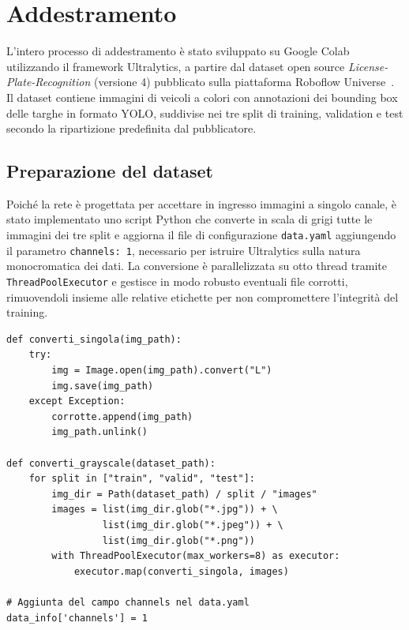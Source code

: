 \section{Addestramento}
\label{sec:addestramento}

L'intero processo di addestramento è stato sviluppato su Google Colab utilizzando il framework Ultralytics, a partire dal dataset open source \textit{License-Plate-Recognition} (versione 4) pubblicato sulla piattaforma Roboflow Universe~\cite{roboflow_universe}. Il dataset contiene immagini di veicoli a colori con annotazioni dei bounding box delle targhe in formato YOLO, suddivise nei tre split di training, validation e test secondo la ripartizione predefinita dal pubblicatore.

\subsection{Preparazione del dataset}
\label{sec:dataset-prep}

Poiché la rete è progettata per accettare in ingresso immagini a singolo canale, è stato implementato uno script Python che converte in scala di grigi tutte le immagini dei tre split e aggiorna il file di configurazione \texttt{data.yaml} aggiungendo il parametro \texttt{channels:~1}, necessario per istruire Ultralytics sulla natura monocromatica dei dati. La conversione è parallelizzata su otto thread tramite \texttt{ThreadPoolExecutor} e gestisce in modo robusto eventuali file corrotti, rimuovendoli insieme alle relative etichette per non compromettere l'integrità del training.

\begin{lstlisting}[style=stilePython, caption={Conversione del dataset in scala di grigi.}, label={lst:gray-conversion}]
def converti_singola(img_path):
    try:
        img = Image.open(img_path).convert("L")
        img.save(img_path)
    except Exception:
        corrotte.append(img_path)
        img_path.unlink()

def converti_grayscale(dataset_path):
    for split in ["train", "valid", "test"]:
        img_dir = Path(dataset_path) / split / "images"
        images = list(img_dir.glob("*.jpg")) + \
                 list(img_dir.glob("*.jpeg")) + \
                 list(img_dir.glob("*.png"))
        with ThreadPoolExecutor(max_workers=8) as executor:
            executor.map(converti_singola, images)

# Aggiunta del campo channels nel data.yaml
data_info['channels'] = 1
\end{lstlisting}

